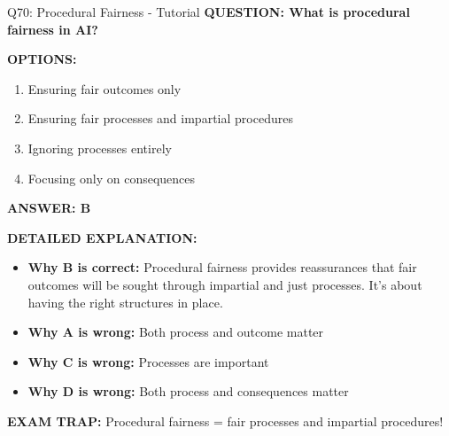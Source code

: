 \documentclass[8pt]{beamer}
\begin{document}
	\begin{frame}{Q70: Procedural Fairness - Tutorial}
		\fontsize{6.5}{7.5}\selectfont
		\textbf{QUESTION: What is procedural fairness in AI?}
		
		\vspace{0.1cm}
		\textbf{OPTIONS:}
		\begin{enumerate}
			\item Ensuring fair outcomes only
			\item Ensuring fair processes and impartial procedures
			\item Ignoring processes entirely
			\item Focusing only on consequences
		\end{enumerate}
		
		\vspace{0.1cm}
		\textcolor{myblue}{\textbf{ANSWER: B}}
		
		\vspace{0.1cm}
		\textbf{DETAILED EXPLANATION:}
		\begin{itemize}
			\item \textbf{Why B is correct:} Procedural fairness provides reassurances that fair outcomes will be sought through impartial and just processes. It's about having the right structures in place.
			\item \textbf{Why A is wrong:} Both process and outcome matter
			\item \textbf{Why C is wrong:} Processes are important
			\item \textbf{Why D is wrong:} Both process and consequences matter
		\end{itemize}
		
		\textcolor{myred}{\textbf{EXAM TRAP:}} Procedural fairness = \textcolor{myblue}{fair processes and impartial procedures}!
	\end{frame}
	
\end{document}
